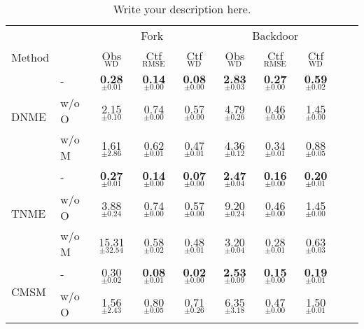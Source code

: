 
\begin{table}[t]
\caption{Write your description here.}
\label{sample-table}
\vskip 0.15in
\begin{center}
\begin{small}
\begin{sc}
\begin{tabular}{llcccccccc}
\toprule
 &  & \multicolumn{3}{c}{Fork} & \multicolumn{3}{c}{Backdoor} \\
      \cmidrule(lr){3-5}                \cmidrule(lr){6-8}
Method & & Obs$_{\text{WD}}$ & Ctf$_{\text{RMSE}}$ & Ctf$_{\text{WD}}$ & Obs$_{\text{WD}}$ & Ctf$_{\text{RMSE}}$ & Ctf$_{\text{WD}}$ \\
\midrule
\multirow{3}{*}{DNME} & -     & \textbf{0.28}$_{\pm \mathbf{0.01}}$ & \textbf{0.14}$_{\pm \mathbf{0.00}}$ & \textbf{0.08}$_{\pm \mathbf{0.00}}$ & \textbf{2.83}$_{\pm \mathbf{0.03}}$ & \textbf{0.27}$_{\pm \mathbf{0.00}}$ & \textbf{0.59}$_{\pm \mathbf{0.02}}$ & \\
                             & w/o O & 2.15$_{\pm 0.10}$ & 0.74$_{\pm 0.00}$ & 0.57$_{\pm 0.00}$ & 4.79$_{\pm 0.26}$ & 0.46$_{\pm 0.00}$ & 1.45$_{\pm 0.00}$ & \\
                             & w/o M & 1.61$_{\pm 2.86}$ & 0.62$_{\pm 0.01}$ & 0.47$_{\pm 0.01}$ & 4.36$_{\pm 0.12}$ & 0.34$_{\pm 0.01}$ & 0.88$_{\pm 0.05}$ & \\
\midrule
\multirow{3}{*}{TNME} & -     & \textbf{0.27}$_{\pm \mathbf{0.01}}$ & \textbf{0.14}$_{\pm \mathbf{0.00}}$ & \textbf{0.07}$_{\pm \mathbf{0.00}}$ & \textbf{2.47}$_{\pm \mathbf{0.04}}$ & \textbf{0.16}$_{\pm \mathbf{0.00}}$ & \textbf{0.20}$_{\pm \mathbf{0.01}}$ & \\
                             & w/o O & 3.88$_{\pm 0.24}$ & 0.74$_{\pm 0.00}$ & 0.57$_{\pm 0.00}$ & 9.20$_{\pm 0.24}$ & 0.46$_{\pm 0.00}$ & 1.45$_{\pm 0.00}$ & \\
                             & w/o M & 15.31$_{\pm 32.54}$ & 0.58$_{\pm 0.02}$ & 0.48$_{\pm 0.01}$ & 3.20$_{\pm 0.04}$ & 0.28$_{\pm 0.01}$ & 0.63$_{\pm 0.03}$ & \\
\midrule
\multirow{4}{*}{CMSM} & -     & 0.30$_{\pm 0.02}$ & \textbf{0.08}$_{\pm \mathbf{0.01}}$ & \textbf{0.02}$_{\pm \mathbf{0.00}}$ & \textbf{2.53}$_{\pm \mathbf{0.09}}$ & \textbf{0.15}$_{\pm \mathbf{0.00}}$ & \textbf{0.19}$_{\pm \mathbf{0.01}}$ & \\
                             & w/o O & 1.56$_{\pm 2.43}$ & 0.80$_{\pm 0.05}$ & 0.71$_{\pm 0.26}$ & 6.35$_{\pm 3.18}$ & 0.47$_{\pm 0.00}$ & 1.50$_{\pm 0.01}$ & \\

\end{tabular}
\end{sc}
\end{small}
\end{center}
\end{table}

